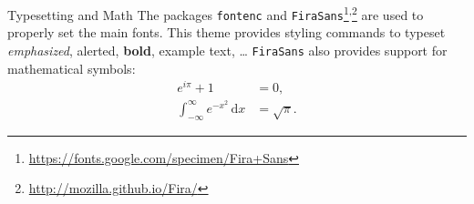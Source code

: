     \begin{frame}{Typesetting and Math}
        The packages \texttt{fontenc} and \texttt{FiraSans}\footnote{\url{https://fonts.google.com/specimen/Fira+Sans}}\textsuperscript{,}\footnote{\url{http://mozilla.github.io/Fira/}} are used to properly set the main fonts.
        \vfill
        This theme provides styling commands to typeset \emph{emphasized}, \alert{alerted}, \textbf{bold}, \textcolor{example}{example text}, \dots
        \vfill
        \texttt{FiraSans} also provides support for mathematical symbols:
        \begin{align*}
            e^{i\pi} + 1 & = 0, \\
            \int_{-\infty}^\infty e^{-x^2}\,\mathrm{d}x & = \sqrt{\pi}.
        \end{align*}
    \end{frame}



